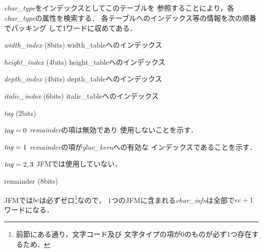 \documentclass[a4paper,11pt,nomag]{jsarticle}
\begin{document}
\subsection{}
{\it char\_type}をインデックスとしてこのテーブルを
参照することにより，各{\it char\_type}の属性を検索する．
各テーブルへのインデックス等の情報を次の順番でパッキング
して1ワードに収めてある．
\begin{description}
\item{{\it width\_index} (8bits)} width\_tableへのインデックス
\item{{\it height\_index} (4bits)} height\_tableへのインデックス
\item{{\it depth\_index} (4bits)} depth\_tableへのインデックス
\item{{\it italic\_index} (6bits)} italic\_tableへのインデックス
\item{{\it tag} (2bits)}
	\begin{description}
	\item{${\it tag}=0$} {\it remainder}の項は無効であり
		使用しないことを示す．
	\item{${\it tag}=1$} {\it remainder}の項が{\it glue\_kern}への有効な
		インデックスであることを示す．
	\item{${\it tag}=2, 3$} JFMでは使用していない．
	\end{description}
\item{remainder (8bits)}
\end{description}
JFMでは$bc$は必ずゼロ\footnote{前節にある通り，文字コード及び
文字タイプの項が0のものが必ず1つ存在するため．}なので，
1つのJFMに含まれる{\it char\_info}は全部で$ec+1$ワードになる．
\end{document}

